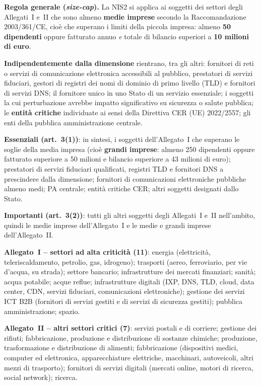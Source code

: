 \begin{integrazione}
\textbf{Regola generale (\emph{size-cap}).} La NIS2 si applica ai soggetti dei settori degli Allegati~I
e~II che sono almeno \textbf{medie imprese} secondo la Raccomandazione 2003/361/CE, cioè che superano i
limiti della piccola impresa: almeno \textbf{50 dipendenti} oppure fatturato annuo \emph{e} totale di
bilancio superiori a \textbf{10 milioni di euro}.

\textbf{Indipendentemente dalla dimensione} rientrano, tra gli altri: fornitori di reti o servizi di
comunicazione elettronica accessibili al pubblico, prestatori di servizi fiduciari, gestori di registri
dei nomi di dominio di primo livello (TLD) e fornitori di servizi DNS; il fornitore unico in uno Stato
di un servizio essenziale; i soggetti la cui perturbazione avrebbe impatto significativo su sicurezza o
salute pubblica; le \textbf{entità critiche} individuate ai sensi della Direttiva CER (UE) 2022/2557;
gli enti della pubblica amministrazione centrale.

\textbf{Essenziali (art.~3(1))}: in sintesi, i soggetti dell'Allegato~I che superano le soglie della
media impresa (cioè \textbf{grandi imprese}: almeno 250 dipendenti oppure fatturato superiore a
50 milioni e bilancio superiore a 43 milioni di euro); prestatori di servizi fiduciari qualificati,
registri TLD e fornitori DNS a prescindere dalla dimensione; fornitori di comunicazioni elettroniche
pubbliche almeno medi; PA centrale; entità critiche CER; altri soggetti designati dallo Stato.

\textbf{Importanti (art.~3(2))}: tutti gli altri soggetti degli Allegati~I e~II nell'ambito, quindi le
medie imprese dell'Allegato~I e le medie e grandi imprese dell'Allegato~II.

\medskip
\textbf{Allegato~I -- settori ad alta criticità (11)}: energia (elettricità, teleriscaldamento,
petrolio, gas, idrogeno); trasporti (aereo, ferroviario, per vie d'acqua, su strada); settore bancario;
infrastrutture dei mercati finanziari; sanità; acqua potabile; acque reflue; infrastrutture digitali
(IXP, DNS, TLD, cloud, data center, CDN, servizi fiduciari, comunicazioni elettroniche); gestione dei
servizi ICT B2B (fornitori di servizi gestiti e di servizi di sicurezza gestiti); pubblica
amministrazione; spazio.

\textbf{Allegato~II -- altri settori critici (7)}: servizi postali e di corriere; gestione dei rifiuti;
fabbricazione, produzione e distribuzione di sostanze chimiche; produzione, trasformazione e
distribuzione di alimenti; fabbricazione (dispositivi medici, computer ed elettronica, apparecchiature
elettriche, macchinari, autoveicoli, altri mezzi di trasporto); fornitori di servizi digitali
(mercati online, motori di ricerca, social network); ricerca.


\end{integrazione}
